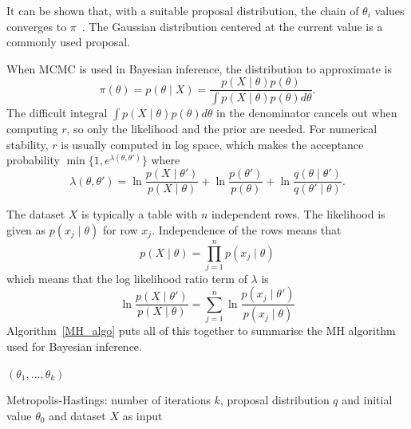 \documentclass[english,twoside,openright]{HYgraduMLDS}
\begin{document}
It can be shown that, with a suitable proposal distribution, the chain of 
\(\theta_i\) values converges to \(\pi\)~\cite{BDA}. The Gaussian distribution centered 
at the current value is a commonly used proposal.

When MCMC is used in Bayesian inference, the distribution to approximate is 
\[
    \pi(\theta) = p(\theta \mid X) = \frac{p(X \mid \theta)p(\theta)}
    {\int p(X\mid \theta)p(\theta)d\theta}.
\]
The difficult integral \(\int p(X\mid \theta)p(\theta)d\theta\) in the denominator 
cancels out when computing \(r\), so only the likelihood and the prior are needed. 
For numerical stability, \(r\) is usually computed in 
log space, which makes the acceptance probability 
\(\min\{1, e^{\lambda(\theta, \theta')}\}\) where 
\[
    \lambda(\theta, \theta') = \ln \frac{p(X\mid \theta')}{p(X\mid \theta)}
    + \ln \frac{p(\theta')}{p(\theta)}
    + \ln \frac{q(\theta\mid \theta')}{q(\theta'\mid \theta)}.
\]

The dataset \(X\) is typically a table with \(n\) independent rows.
The likelihood is given as \(p(x_j\mid \theta)\)
for row \(x_j\). Independence of the rows means that 
\[
    p(X\mid \theta) = \prod_{j=1}^n p(x_j\mid \theta)
\]
which means that the log likelihood ratio term of \(\lambda\) is 
\[
    \ln \frac{p(X\mid \theta')}{p(X\mid \theta)}
    = \sum_{j=1}^n \ln\frac{p(x_j\mid \theta')}{p(x_j\mid \theta)}
\]
Algorithm~\ref{MH_algo} puts all of this together to summarise the MH 
algorithm used for Bayesian inference.

\begin{algorithm}[H]\label{MH_algo}
    \SetAlgoLined
    \Return \((\theta_1, \dotsc, \theta_k)\)
    \caption{
        Metropolis-Hastings: number of iterations \(k\), proposal 
        distribution \(q\) and initial value \(\theta_0\) and 
        dataset \(X\) as input
    }
\end{algorithm}
\end{document}
